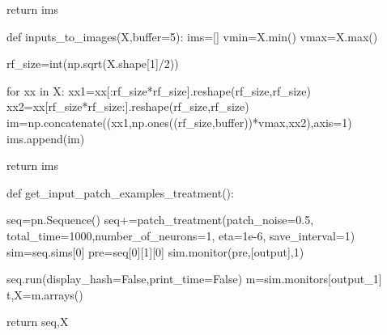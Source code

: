 \documentclass[
  letterpaper,
]{book}
\newenvironment{Shaded}{\begin{snugshade}}{\end{snugshade}}
\newcommand{\BuiltInTok}[1]{\textcolor[rgb]{0.00,0.23,0.31}{#1}}
\newcommand{\ControlFlowTok}[1]{\textcolor[rgb]{0.00,0.23,0.31}{#1}}
\newcommand{\DecValTok}[1]{\textcolor[rgb]{0.68,0.00,0.00}{#1}}
\newcommand{\FloatTok}[1]{\textcolor[rgb]{0.68,0.00,0.00}{#1}}
\newcommand{\KeywordTok}[1]{\textcolor[rgb]{0.00,0.23,0.31}{#1}}
\newcommand{\NormalTok}[1]{\textcolor[rgb]{0.00,0.23,0.31}{#1}}
\newcommand{\OperatorTok}[1]{\textcolor[rgb]{0.37,0.37,0.37}{#1}}
\newcommand{\StringTok}[1]{\textcolor[rgb]{0.13,0.47,0.30}{#1}}
\newcommand{\VariableTok}[1]{\textcolor[rgb]{0.07,0.07,0.07}{#1}}
\begin{document}
\begin{Shaded}
\begin{Highlighting}[]
    \ControlFlowTok{return}\NormalTok{ ims}

\KeywordTok{def}\NormalTok{ inputs\_to\_images(X,}\BuiltInTok{buffer}\OperatorTok{=}\DecValTok{5}\NormalTok{):}
\NormalTok{    ims}\OperatorTok{=}\NormalTok{[]}
\NormalTok{    vmin}\OperatorTok{=}\NormalTok{X.}\BuiltInTok{min}\NormalTok{()}
\NormalTok{    vmax}\OperatorTok{=}\NormalTok{X.}\BuiltInTok{max}\NormalTok{()}
    
\NormalTok{    rf\_size}\OperatorTok{=}\BuiltInTok{int}\NormalTok{(np.sqrt(X.shape[}\DecValTok{1}\NormalTok{]}\OperatorTok{/}\DecValTok{2}\NormalTok{))}
        
    \ControlFlowTok{for}\NormalTok{ xx }\KeywordTok{in}\NormalTok{ X:}
\NormalTok{        xx1}\OperatorTok{=}\NormalTok{xx[:rf\_size}\OperatorTok{*}\NormalTok{rf\_size].reshape(rf\_size,rf\_size)}
\NormalTok{        xx2}\OperatorTok{=}\NormalTok{xx[rf\_size}\OperatorTok{*}\NormalTok{rf\_size:].reshape(rf\_size,rf\_size)}
\NormalTok{        im}\OperatorTok{=}\NormalTok{np.concatenate((xx1,np.ones((rf\_size,}\BuiltInTok{buffer}\NormalTok{))}\OperatorTok{*}\NormalTok{vmax,xx2),axis}\OperatorTok{=}\DecValTok{1}\NormalTok{)   }
\NormalTok{        ims.append(im)}
        
    \ControlFlowTok{return}\NormalTok{ ims}

\KeywordTok{def}\NormalTok{ get\_input\_patch\_examples\_treatment():}
    
\NormalTok{    seq}\OperatorTok{=}\NormalTok{pn.Sequence()    }
\NormalTok{    seq}\OperatorTok{+=}\NormalTok{patch\_treatment(patch\_noise}\OperatorTok{=}\FloatTok{0.5}\NormalTok{,}
\NormalTok{               total\_time}\OperatorTok{=}\DecValTok{1000}\NormalTok{,number\_of\_neurons}\OperatorTok{=}\DecValTok{1}\NormalTok{,}
\NormalTok{               eta}\OperatorTok{=}\FloatTok{1e{-}6}\NormalTok{,}
\NormalTok{               save\_interval}\OperatorTok{=}\DecValTok{1}\NormalTok{)}
\NormalTok{    sim}\OperatorTok{=}\NormalTok{seq.sims[}\DecValTok{0}\NormalTok{]}
\NormalTok{    pre}\OperatorTok{=}\NormalTok{seq[}\DecValTok{0}\NormalTok{][}\DecValTok{1}\NormalTok{][}\DecValTok{0}\NormalTok{]}
\NormalTok{    sim.monitor(pre,[}\StringTok{\textquotesingle{}output\textquotesingle{}}\NormalTok{],}\DecValTok{1}\NormalTok{)}

\NormalTok{    seq.run(display\_hash}\OperatorTok{=}\VariableTok{False}\NormalTok{,print\_time}\OperatorTok{=}\VariableTok{False}\NormalTok{)}
\NormalTok{    m}\OperatorTok{=}\NormalTok{sim.monitors[}\StringTok{\textquotesingle{}output\_1\textquotesingle{}}\NormalTok{]}
\NormalTok{    t,X}\OperatorTok{=}\NormalTok{m.arrays()    }
    
    \ControlFlowTok{return}\NormalTok{ seq,X}
\end{Highlighting}
\end{Shaded}
\end{document}
